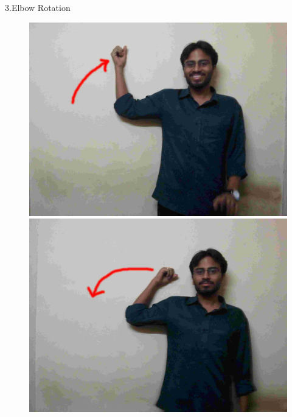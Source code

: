 \documentclass{beamer}
\begin{document}
\begin{frame}{3.Elbow Rotation}
  \begin{figure}
      \centering
      \includegraphics[scale = .06]{gestures/31.jpg} 
      \includegraphics[scale = .06]{gestures/32.jpg} 
  \end{figure}
\end{frame}
\end{document}
